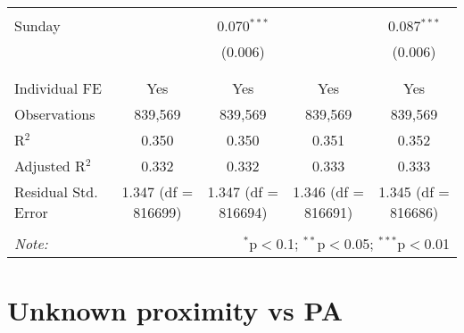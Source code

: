 \documentclass[
]{article}
\begin{document}
\begin{table}[!htbp]
{\begin{tabular}{@{\extracolsep{5pt}}lcccc}
  & & & & \\ 
 Sunday &  & 0.070$^{***}$ &  & 0.087$^{***}$ \\ 
  &  & (0.006) &  & (0.006) \\ 
  & & & & \\ 
\hline \\[-1.8ex] 
Individual FE & Yes & Yes & Yes & Yes \\ 
Observations & 839,569 & 839,569 & 839,569 & 839,569 \\ 
R$^{2}$ & 0.350 & 0.350 & 0.351 & 0.352 \\ 
Adjusted R$^{2}$ & 0.332 & 0.332 & 0.333 & 0.333 \\ 
Residual Std. Error & 1.347 (df = 816699) & 1.347 (df = 816694) & 1.346 (df = 816691) & 1.345 (df = 816686) \\ 
\hline 
\hline \\[-1.8ex] 
\textit{Note:}  & \multicolumn{4}{r}{$^{*}$p$<$0.1; $^{**}$p$<$0.05; $^{***}$p$<$0.01} \\ 
\end{tabular}
} 
\end{table} 
\newpage
\section{Unknown proximity vs PA}
\end{document}
